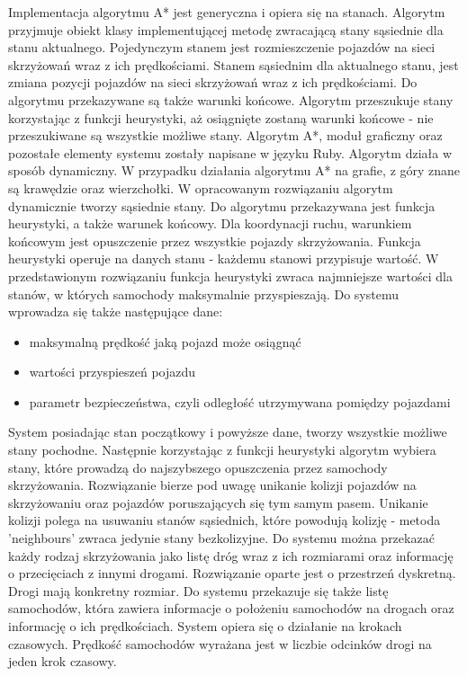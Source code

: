 \newline
\indent 
Implementacja algorytmu A* jest generyczna i opiera się na stanach. Algorytm przyjmuje obiekt klasy implementującej metodę zwracającą stany sąsiednie dla stanu aktualnego. Pojedynczym stanem jest rozmieszczenie pojazdów na sieci skrzyżowań wraz z ich prędkościami. Stanem sąsiednim dla aktualnego stanu, jest zmiana pozycji pojazdów na sieci skrzyżowań wraz z ich prędkościami. Do algorytmu przekazywane są także warunki końcowe. Algorytm przeszukuje stany korzystając z funkcji heurystyki, aż osiągnięte zostaną warunki końcowe - nie przeszukiwane są wszystkie możliwe stany. Algorytm A*, moduł graficzny oraz pozostałe elementy systemu zostały napisane w języku Ruby. Algorytm działa w sposób dynamiczny. W przypadku działania algorytmu A* na grafie, z góry znane są krawędzie oraz wierzchołki. W opracowanym rozwiązaniu algorytm dynamicznie tworzy sąsiednie stany.
\newline
\indent
Do algorytmu przekazywana jest funkcja heurystyki, a także warunek końcowy. Dla koordynacji ruchu, warunkiem końcowym jest opuszczenie przez wszystkie pojazdy skrzyżowania. Funkcja heurystyki operuje na danych stanu - każdemu stanowi przypisuje wartość. W przedstawionym rozwiązaniu funkcja heurystyki zwraca najmniejsze wartości dla stanów, w których samochody maksymalnie przyspieszają.
\newline
\newline
\noindent
Do systemu wprowadza się także następujące dane:
\begin{itemize}
\item maksymalną prędkość jaką pojazd może osiągnąć
\item wartości przyspieszeń pojazdu
\item parametr bezpieczeństwa, czyli odległość utrzymywana pomiędzy pojazdami
\end{itemize}
System posiadając stan początkowy i powyższe dane, tworzy wszystkie możliwe stany pochodne. Następnie korzystając z funkcji heurystyki algorytm wybiera stany, które prowadzą do najszybszego opuszczenia przez samochody skrzyżowania.
\newline
\indent
Rozwiązanie bierze pod uwagę unikanie kolizji pojazdów na skrzyżowaniu oraz pojazdów poruszających się tym samym pasem. Unikanie kolizji polega na usuwaniu stanów sąsiednich, które powodują kolizję - metoda 'neighbours' zwraca jedynie stany bezkolizyjne.
\newline
\indent
Do systemu można przekazać każdy rodzaj skrzyżowania jako listę dróg wraz z ich rozmiarami oraz informację o przecięciach z innymi drogami. Rozwiązanie oparte jest o przestrzeń dyskretną. Drogi mają konkretny rozmiar. Do systemu przekazuje się także listę samochodów, która zawiera informacje o położeniu samochodów na drogach oraz informację o ich prędkościach. System opiera się o działanie na krokach czasowych. Prędkość samochodów wyrażana jest w liczbie odcinków drogi na jeden krok czasowy.
